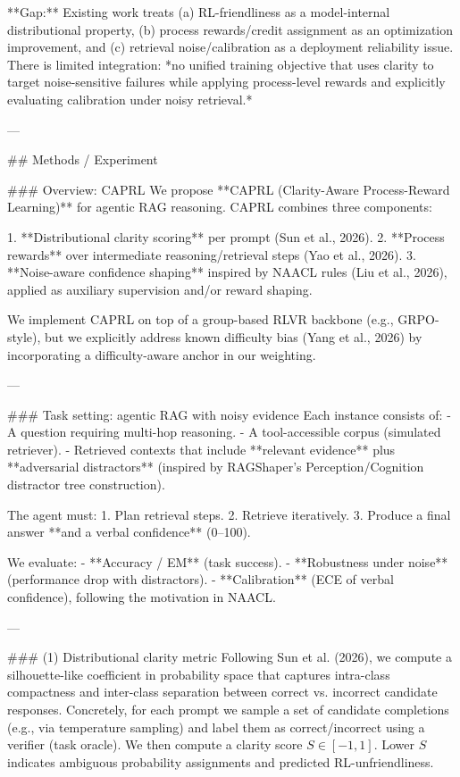 **Gap:** Existing work treats (a) RL-friendliness as a model-internal distributional property, (b) process rewards/credit assignment as an optimization improvement, and (c) retrieval noise/calibration as a deployment reliability issue. There is limited integration: *no unified training objective that uses clarity to target noise-sensitive failures while applying process-level rewards and explicitly evaluating calibration under noisy retrieval.*

---

## Methods / Experiment  

### Overview: CAPRL  
We propose **CAPRL (Clarity-Aware Process-Reward Learning)** for agentic RAG reasoning. CAPRL combines three components:

1. **Distributional clarity scoring** per prompt (Sun et al., 2026).  
2. **Process rewards** over intermediate reasoning/retrieval steps (Yao et al., 2026).  
3. **Noise-aware confidence shaping** inspired by NAACL rules (Liu et al., 2026), applied as auxiliary supervision and/or reward shaping.

We implement CAPRL on top of a group-based RLVR backbone (e.g., GRPO-style), but we explicitly address known difficulty bias (Yang et al., 2026) by incorporating a difficulty-aware anchor in our weighting.

---

### Task setting: agentic RAG with noisy evidence  
Each instance consists of:
- A question requiring multi-hop reasoning.
- A tool-accessible corpus (simulated retriever).
- Retrieved contexts that include **relevant evidence** plus **adversarial distractors** (inspired by RAGShaper’s Perception/Cognition distractor tree construction).

The agent must:
1. Plan retrieval steps.
2. Retrieve iteratively.
3. Produce a final answer **and a verbal confidence** (0–100).

We evaluate:
- **Accuracy / EM** (task success).
- **Robustness under noise** (performance drop with distractors).
- **Calibration** (ECE of verbal confidence), following the motivation in NAACL.

---

### (1) Distributional clarity metric  
Following Sun et al. (2026), we compute a silhouette-like coefficient in probability space that captures intra-class compactness and inter-class separation between correct vs. incorrect candidate responses. Concretely, for each prompt we sample a set of candidate completions (e.g., via temperature sampling) and label them as correct/incorrect using a verifier (task oracle). We then compute a clarity score \(S\in[-1,1]\). Lower \(S\) indicates ambiguous probability assignments and predicted RL-unfriendliness.

